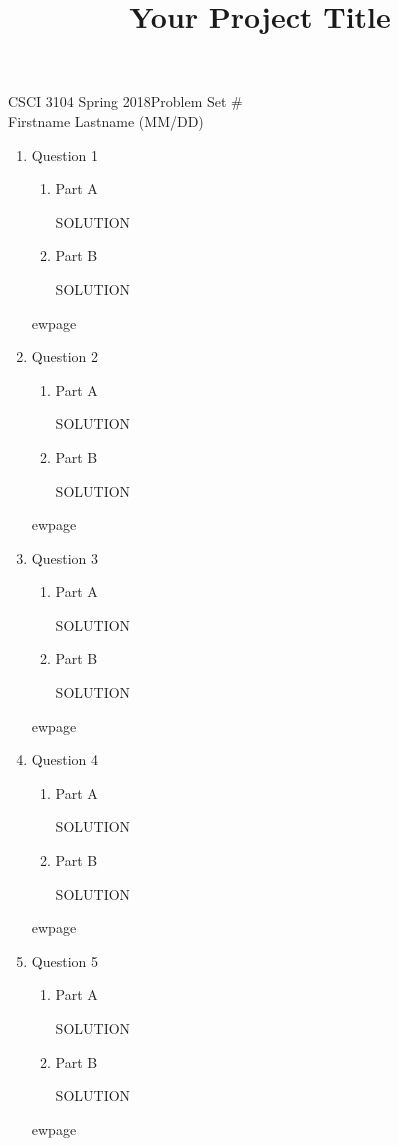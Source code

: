 \documentclass[12pt]{article}
\title{Your Project Title}
\begin{document}
CSCI 3104 Spring 2018\hfill Problem Set \#\\
Firstname Lastname (MM/DD)

\hrulefill

\begin{enumerate}
\item Question 1
  \begin{enumerate}
  \item Part A

  SOLUTION

  \item Part B

  SOLUTION
  \end{enumerate}

ewpage

\item Question 2
  \begin{enumerate}
  \item Part A

  SOLUTION

  \item Part B

  SOLUTION
  \end{enumerate}

ewpage

\item Question 3
  \begin{enumerate}
  \item Part A

  SOLUTION

  \item Part B

  SOLUTION
  \end{enumerate}

ewpage

\item Question 4
  \begin{enumerate}
  \item Part A

  SOLUTION

  \item Part B

  SOLUTION
  \end{enumerate}

ewpage

\item Question 5
  \begin{enumerate}
  \item Part A

  SOLUTION

  \item Part B

  SOLUTION
  \end{enumerate}

ewpage

\end{enumerate}
\end{document}
